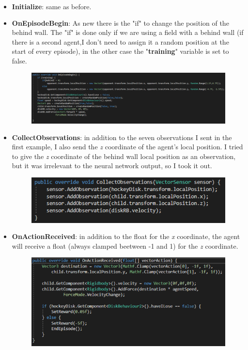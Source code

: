 \documentclass[12pt]{article}
\begin{document}
	\begin{itemize}
		\item \textbf{Initialize}: same as before.
		
		\item \textbf{OnEpisodeBegin}: As new there is the "if" to change the position of the behind wall. The "if" is done only if we are using a field with a behind wall  (if there is a second agent,I don't need to assign it a random position at the start of every episode), in the other case the "\textbf{training}" variable is set to false.
		
		\begin{figure}[hbt!]
			\centering
			\includegraphics[width= 1.25
			\textwidth]{images/OnEpisodeBegin2.png}
		\end{figure}
		
		\item \textbf{CollectObservations}: in addition to the seven observations I sent in the first example, I also send the \textit{z} coordinate of the agent's local position. I tried to give the \textit{z} coordinate of the behind wall local position as an observation, but it was irrelevant to the neural network output, so I took it out.
		
		\begin{figure}[hbt!]
			\centering
			\includegraphics[width= 1
			\textwidth]{images/CollectObservation2.png}
		\end{figure}
		
		\item \textbf{OnActionReceived}: in addition to the float for the \textit{x} coordinate, the agent will receive a float (always clamped beetween -1 and 1) for the \textit{z} coordinate. 
		
		\begin{figure}[hbt!]
			\centering
			\includegraphics[width= 1
			\textwidth]{images/OnActionReceived2.png}
		\end{figure}
		

\end{itemize}
\end{document}
